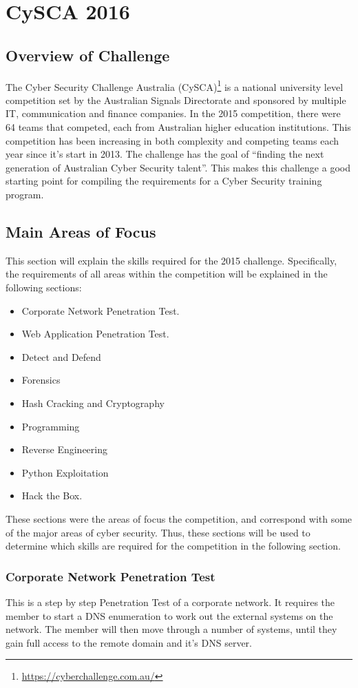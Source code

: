 \documentclass[a4paper,11pt]{report}
\begin{document}
\chapter{CySCA 2016}
	\section{Overview of Challenge}
		The Cyber Security Challenge Australia (CySCA)\footnote{\url{https://cyberchallenge.com.au/}} is a national university level competition set by the Australian Signals Directorate 
		and sponsored by multiple IT, communication and finance companies. 
		In the 2015 competition, there were 64 teams that competed, each from Australian higher education institutions. 
		This competition has been increasing in both complexity and competing teams each year since it's start in 2013. 
		The challenge has the goal of ``finding the next generation of Australian Cyber Security talent''.
		This makes this challenge a good starting point for compiling the requirements for a Cyber Security training program. 
	\section{Main Areas of Focus}
		This section will explain the skills required for the 2015 challenge. 
		Specifically, the requirements of all areas within the competition will be explained in the following sections:
		\begin{itemize}
			\item Corporate Network Penetration Test.
			\item Web Application Penetration Test. 
			\item Detect and Defend
			\item Forensics
			\item Hash Cracking and Cryptography
			\item Programming
			\item Reverse Engineering
			\item Python Exploitation
			\item Hack the Box. 
		\end{itemize}
		These sections were the areas of focus the competition, and correspond with some of the major areas of cyber security.
		Thus, these sections will be used to determine which skills are required for the competition in the following section. 
		\subsection{Corporate Network Penetration Test}
			This is a step by step Penetration Test of a corporate network. 
			It requires the member to start a DNS enumeration to work out the external systems on the network. 
			The member will then move through a number of systems, 
			until they gain full access to the remote domain and it's DNS server. 
\end{document}
